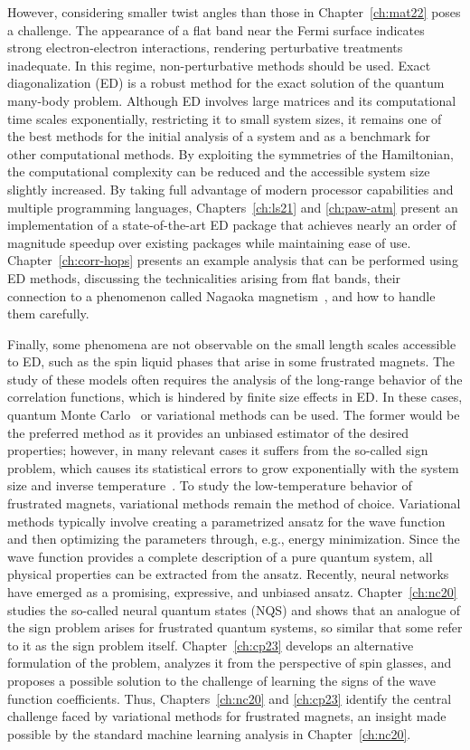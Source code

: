 However, considering smaller twist angles than those in Chapter~\ref{ch:mat22} poses a challenge. The appearance of a flat band near the Fermi surface indicates strong electron-electron interactions, rendering perturbative treatments inadequate. In this regime, non-perturbative methods should be used. Exact diagonalization (ED) is a robust method for the exact solution of the quantum many-body problem. Although ED involves large matrices and its computational time scales exponentially, restricting it to small system sizes, it remains one of the best methods for the initial analysis of a system and as a benchmark for other computational methods. By exploiting the symmetries of the Hamiltonian, the computational complexity can be reduced and the accessible system size slightly increased. By taking full advantage of modern processor capabilities and multiple programming languages, Chapters~\ref{ch:ls21} and \ref{ch:paw-atm} present an implementation of a state-of-the-art ED package that achieves nearly an order of magnitude speedup over existing packages while maintaining ease of use. Chapter~\ref{ch:corr-hops} presents an example analysis that can be performed using ED methods, discussing the technicalities arising from flat bands, their connection to a phenomenon called Nagaoka magnetism~\cite{Nagaok_1966_Ferromagnetism}, and how to handle them carefully.

Finally, some phenomena are not observable on the small length scales accessible to ED, such as the spin liquid phases that arise in some frustrated magnets. The study of these models often requires the analysis of the long-range behavior of the correlation functions, which is hindered by finite size effects in ED. In these cases, quantum Monte Carlo~\cite{Sandvi_1991_Quantum_Monte_C} or variational methods can be used. The former would be the preferred method as it provides an unbiased estimator of the desired properties; however, in many relevant cases it suffers from the so-called sign problem, which causes its statistical errors to grow exponentially with the system size and inverse temperature~\cite{NP_Troyer}. To study the low-temperature behavior of frustrated magnets, variational methods remain the method of choice. Variational methods typically involve creating a parametrized ansatz for the wave function and then optimizing the parameters through, e.g., energy minimization. Since the wave function provides a complete description of a pure quantum system, all physical properties can be extracted from the ansatz. Recently, neural networks have emerged as a promising, expressive, and unbiased ansatz. Chapter~\ref{ch:nc20} studies the so-called neural quantum states (NQS) and shows that an analogue of the sign problem arises for frustrated quantum systems, so similar that some refer to it as the sign problem itself. Chapter~\ref{ch:cp23} develops an alternative formulation of the problem, analyzes it from the perspective of spin glasses, and proposes a possible solution to the challenge of learning the signs of the wave function coefficients. Thus, Chapters~\ref{ch:nc20} and \ref{ch:cp23} identify the central challenge faced by variational methods for frustrated magnets, an insight made possible by the standard machine learning analysis in Chapter~\ref{ch:nc20}.
